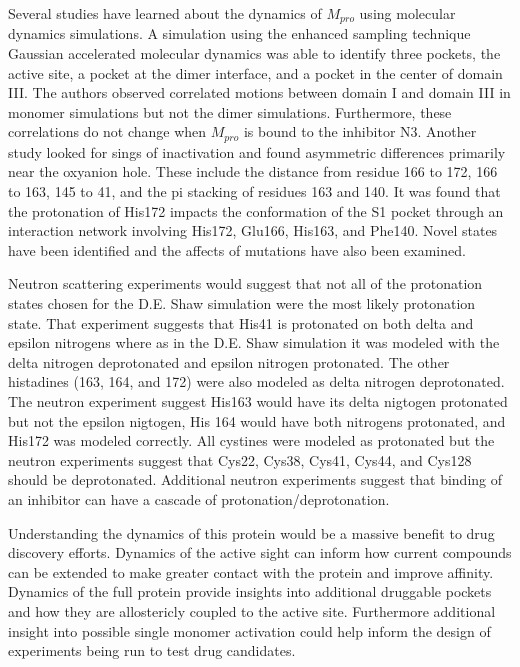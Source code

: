 \documentclass{biophys-new}
\begin{document}
Several studies have learned about the dynamics of $M_{pro}$ using molecular dynamics simulations. A simulation using the enhanced sampling technique Gaussian accelerated molecular dynamics was able to identify three pockets, the active site, a pocket at the dimer interface, and a pocket in the center of domain III. The authors observed correlated motions between domain I and domain III in monomer simulations but not the dimer simulations. Furthermore, these correlations do not change when $M_{pro}$ is bound to the inhibitor N3\cite{sztain2020elucidation}. Another study looked for sings of inactivation and found asymmetric differences primarily near the oxyanion hole. These include the distance from residue 166 to 172, 166 to 163, 145 to 41, and the pi stacking of residues 163 and 140.\cite{inizan2021high} It was found that the protonation of His172  impacts the conformation of the S1 pocket through an interaction network involving His172, Glu166, His163, and Phe140.\cite{verma2020proton} Novel states have been identified \cite{carli2020candidate, cocina2020sapphire} and the affects of mutations have also been examined. \cite{dubanevics2021computational, zhou2019identification}

Neutron scattering experiments would suggest that not all of the protonation states chosen for the D.E. Shaw simulation were the most likely protonation state.\cite{kneller2020unusual} That experiment suggests that His41 is protonated on both delta and epsilon nitrogens where as in the D.E. Shaw simulation it was modeled with the delta nitrogen deprotonated and epsilon nitrogen protonated. The other histadines (163, 164, and 172) were also modeled as delta nitrogen deprotonated. The neutron experiment suggest His163 would have its delta nigtogen protonated but not the epsilon nigtogen, His 164 would have both nitrogens protonated, and His172 was modeled correctly. All cystines were modeled as protonated but the neutron experiments suggest that Cys22, Cys38, Cys41, Cys44, and Cys128 should be deprotonated. Additional neutron experiments suggest that binding of an inhibitor can have a cascade of protonation/deprotonation.\cite{kneller2021direct}

Understanding the dynamics of this protein would be a massive benefit to drug discovery efforts. Dynamics of the active sight can inform how current compounds can be extended to make greater contact with the protein and improve affinity. Dynamics of the full protein provide insights into additional druggable pockets and how they are allostericly coupled to the active site. Furthermore additional insight into possible single monomer activation could help inform the design of experiments being run to test drug candidates.
\end{document}

